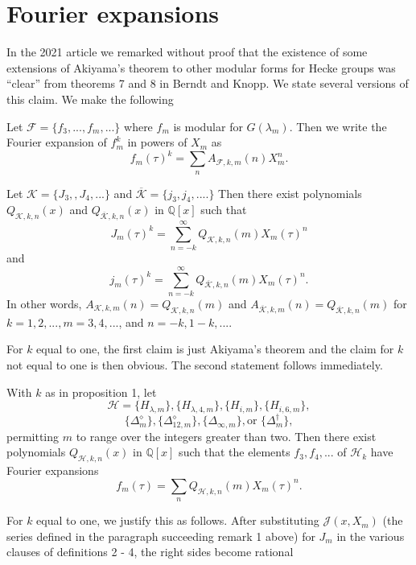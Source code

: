 \documentclass{article}
\begin{document}
 \section{Fourier expansions}
 \noindent
In the 2021 article
\cite{interpolating}
we remarked without
proof that 
the existence of some extensions of
Akiyama's theorem to other
modular forms for Hecke groups
was ``clear'' from 
theorems 7 and 8 in Berndt 
and Knopp. We
state several versions
of this claim.
 We make the following 
 \begin{definition}
 Let $\mathcal{F} = \{f_3, ..., f_m, ...\}$
 where $f_m$ is modular for $G(\lambda_m)$.
 Then we write the Fourier expansion
 of $f_m^k$ in powers of $X_m$ as
$$
f_m(\tau)^k = \sum_n A_{\mathcal{F},k,m}(n)X_m^n.
$$
 \end{definition} \noindent
\begin{proposition}
Let 
$\mathcal{K} =
\{J_3, , J_4,...\}$
and $\overline{\mathcal{K}} =
\{j_3, j_4,....\}$
Then there exist polynomials
$Q_{\mathcal{K},k,n}(x)$ and
$Q_{\overline{\mathcal{K}},k,n}(x)$
in $\mathbb{Q}[x]$
such that 
$$J_m(\tau)^k = 
\sum_{n = -k}^{\infty} 
Q_{\mathcal{K},k,n}(m) X_m(\tau)^n$$ and
$$j_m(\tau)^k = 
\sum_{n = -k}^{\infty} 
Q_{\overline{\mathcal{K}},k,n}(m) 
X_m(\tau)^n.$$
In other words,
$A_{\mathcal{K},k,m}(n) = Q_{\mathcal{K},k,n}(m)$
and 
$A_{\overline{\mathcal{K}},k,m}(n) = 
Q_{\overline{\mathcal{K}},k,n}(m)$
for $k = 1, 2, ..., m = 3, 4, ...$,
and $n = -k, 1-k, ....$
\end{proposition} 
\noindent
For $k$ equal to one, 
the first claim is
just Akiyama's theorem and
the claim for $k$ not equal to
one is then obvious.
The second statement 
follows immediately.
\begin{proposition}
With $k$ as in proposition 1,
let $$\mathcal{H}
= \{H_{\lambda,m}\},
\{H_{\lambda,4,m}\},
\{H_{i,m}\},
\{H_{i,6,m}\},$$
$$
\{\Delta^{\diamond}_m\},
\{
\Delta^{\diamond}_{12,m}\},
\{\Delta_{\infty,m}\},
\text{or }
\{
\Delta^{\dagger}_m\},
$$
permitting $m$ to range over the integers 
greater than two.
Then there exist polynomials 
$Q_{\mathcal{H},k,n}(x)$
in $\mathbb{Q}[x]$
such that the elements $f_3, f_4, ...$ of 
$\mathcal{H}_k$
have Fourier expansions 
$$f_m(\tau) = 
\sum_n Q_{\mathcal{H},k,n}(m) X_m(\tau)^n.$$
\end{proposition} \noindent
For $k$ equal to one,
we justify this as follows.
After substituting $\mathcal{J}(x,X_m)$
(the series defined in the paragraph succeeding
remark 1 above)
for $J_m$ in the various clauses of 
definitions 2 - 4,
the right sides become rational 
\end{document}
